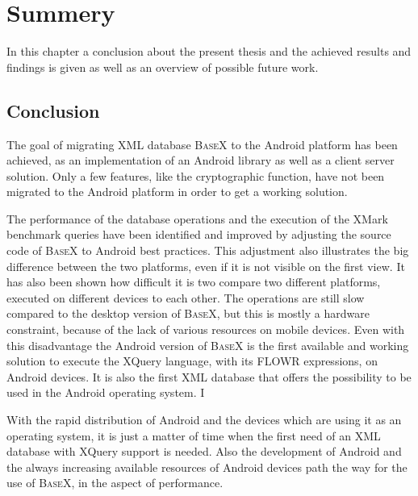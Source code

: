 \chapter{Summery}
\label{cha:summery}
In this chapter a conclusion about the present thesis and the achieved results and findings is given as well as an overview of possible future work.
\section{Conclusion}
\label{sec:summery:conclusion}
The goal of migrating XML database \textsc{BaseX} to the Android platform has been achieved, as an implementation of an Android library as well as a client server solution.
Only a few features, like the cryptographic function, have not been migrated to the Android platform in order to get a working solution.



The performance of the database operations and the execution of the XMark benchmark queries have been identified and improved by adjusting the source code of \textsc{BaseX} to Android best practices.
This adjustment also illustrates the big difference between the two platforms, even if it is not visible on the first view.
It has also been shown how difficult it is two compare two different platforms, executed on different devices to each other.
The operations are still slow compared to the desktop version of \textsc{BaseX}, but this is mostly a hardware constraint, because of the lack of various resources on mobile devices.
Even with this disadvantage the Android version of \textsc{BaseX} is the first available and working solution to execute the XQuery language, with its FLOWR expressions, on Android devices.
It is also the first XML database that offers the possibility to be used in the Android operating system.
I%




With the rapid distribution of Android and the devices which are using it as an operating system, it is just a matter of time when the first need of an XML database with XQuery support is needed.
Also the development of Android and the always increasing available resources of Android devices path the way for the use of \textsc{BaseX}, in the aspect of performance.



